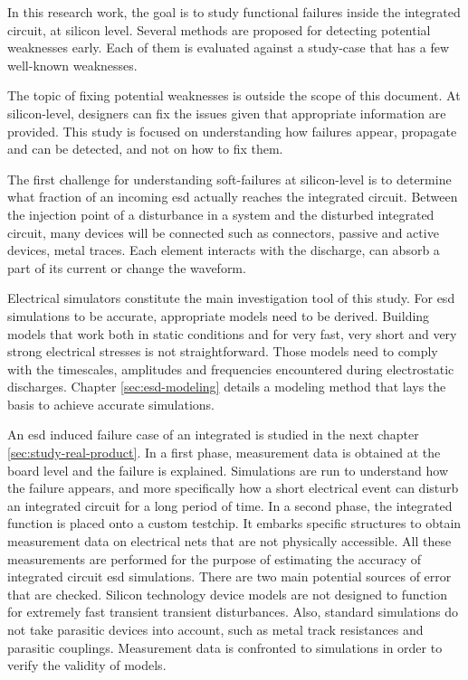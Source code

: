 In this research work, the goal is to study functional failures inside the integrated circuit, at silicon level.
Several methods are proposed for detecting potential weaknesses early.
Each of them is evaluated against a study-case that has a few well-known weaknesses.

The topic of fixing potential weaknesses is outside the scope of this document.
At silicon-level, designers can fix the issues given that appropriate information are provided.
This study is focused on understanding how failures appear, propagate and can be detected, and not on how to fix them.

The first challenge for understanding soft-failures at silicon-level is to determine what fraction of an incoming \gls{esd} actually reaches the integrated circuit.
Between the injection point of a disturbance in a system and the disturbed integrated circuit, many devices will be connected such as connectors, passive and active devices, metal traces.
Each element interacts with the discharge, can absorb a part of its current or change the waveform.

Electrical simulators constitute the main investigation tool of this study.
For \gls{esd} simulations to be accurate, appropriate models need to be derived.
Building models that work both in static conditions and for very fast, very short and very strong electrical stresses is not straightforward.
Those models need to comply with the timescales, amplitudes and frequencies encountered during electrostatic discharges.
Chapter \ref{sec:esd-modeling} details a modeling method that lays the basis to achieve accurate simulations.

An \gls{esd} induced failure case of an integrated is studied in the next chapter \ref{sec:study-real-product}.
In a first phase, measurement data is obtained at the board level and the failure is explained.
Simulations are run to understand how the failure appears, and more specifically how a short electrical event can disturb an integrated circuit for a long period of time.
In a second phase, the integrated function is placed onto a custom testchip.
It embarks specific structures to obtain measurement data on electrical nets that are not physically accessible.
All these measurements are performed for the purpose of estimating the accuracy of integrated circuit \gls{esd} simulations.
There are two main potential sources of error that are checked.
Silicon technology device models are not designed to function for extremely fast transient transient disturbances.
Also, standard simulations do not take parasitic devices into account, such as metal track resistances and parasitic couplings.
Measurement data is confronted to simulations in order to verify the validity of models.

